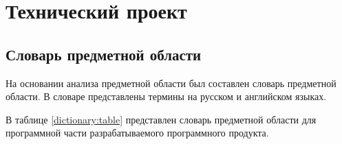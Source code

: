 \section{Технический проект}
\subsection{Словарь предметной области}

На основании анализа предметной области был составлен словарь предметной области. В словаре представлены термины на русском и английском языках.

В таблице \ref{dictionary:table} представлен словарь предметной области для программной части разрабатываемого программного продукта.

\renewcommand{\arraystretch}{0.8} %
